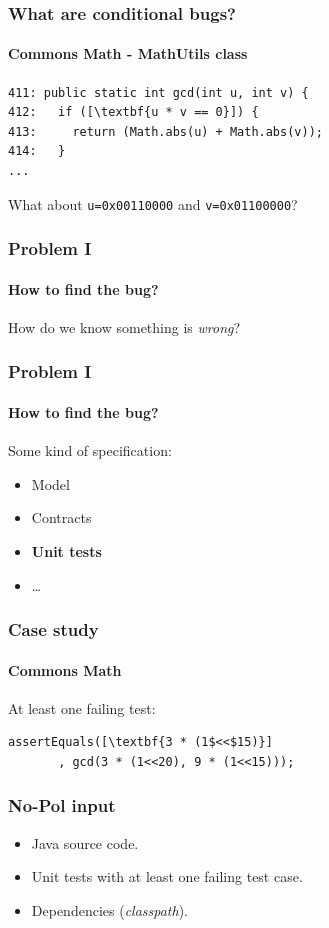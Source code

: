 \documentclass[onlymath]{beamer}
\begin{document}
\begin{frame}[fragile]
\frametitle{What are conditional bugs?}
\framesubtitle{Commons Math - MathUtils class}
    
\begin{lstlisting}[escapeinside=\[\]]
411: public static int gcd(int u, int v) {
412:   if ([\textbf{u * v == 0}]) {
413:     return (Math.abs(u) + Math.abs(v));
414:   }
...
\end{lstlisting}

\vspace{2em}

\centering What about \texttt{u=0x00110000} and  \texttt{v=0x01100000}?

\end{frame}

\begin{frame}
\frametitle{Problem I}
\framesubtitle{How to find the bug?}
How do we know something is \textit{wrong}?
\end{frame}

\begin{frame}
\frametitle{Problem I}
\framesubtitle{How to find the bug?}
Some kind of specification:
\begin{itemize}
 \item Model
 \item Contracts
 \item \textbf{Unit tests}
 \item \dots
\end{itemize}
\end{frame}

\begin{frame}[fragile]
    \frametitle{Case study}
      \framesubtitle{Commons Math}
At least one failing test:
      
      \begin{lstlisting}[escapeinside=\[\]]
assertEquals([\textbf{3 * (1$<<$15)}]
       , gcd(3 * (1<<20), 9 * (1<<15)));
	\end{lstlisting}
\end{frame}

\begin{frame}
\frametitle{No-Pol input}
\begin{itemize}
 \item Java source code.
 \item Unit tests with at least one failing test case.
 \item Dependencies (\textit{classpath}).
\end{itemize}
\end{frame}
\end{document}
